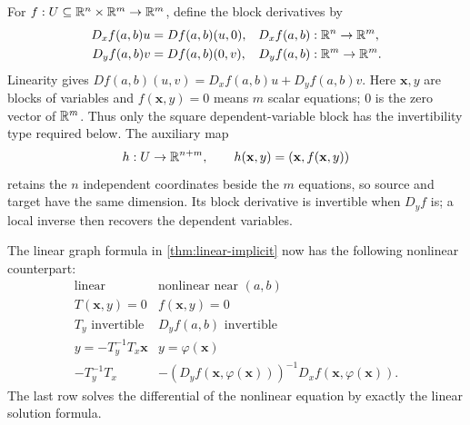 For $f:U\subseteq\mathbb{R}^n\times\mathbb{R}^m\to\mathbb{R}^m$, define the block derivatives by
\[
\begin{aligned}
D_xf(a,b)u&=Df(a,b)(u,0),&D_xf(a,b)&:\mathbb{R}^n\to\mathbb{R}^m,\\
D_yf(a,b)v&=Df(a,b)(0,v),&D_yf(a,b)&:\mathbb{R}^m\to\mathbb{R}^m.
\end{aligned}
\]
Linearity gives $Df(a,b)(u,v)=D_xf(a,b)u+D_yf(a,b)v$.
Here $\mathbf{x},y$ are blocks of variables and $f(\mathbf{x},y)=0$ means $m$ scalar
equations; $0$ is the zero vector of $\mathbb{R}^m$. Thus only the square
dependent-variable block has the invertibility type required below.
The auxiliary map
\[
h:U\to\mathbb{R}^{n+m},\qquad h(\mathbf{x},y)=(\mathbf{x},f(\mathbf{x},y))
\]
retains the $n$ independent coordinates beside the $m$ equations, so
source and target have the same dimension. Its block derivative is
invertible when $D_yf$ is; a local inverse then recovers the dependent variables.


The linear graph formula in \cref{thm:linear-implicit} now has the following
nonlinear counterpart:
\[
\begin{array}{c|c}
\text{linear}&\text{nonlinear near }(a,b)\\\hline
T(\mathbf{x},y)=0&f(\mathbf{x},y)=0\\
T_y\text{ invertible}&D_yf(a,b)\text{ invertible}\\
y=-T_y^{-1}T_x\mathbf{x}&y=\varphi(\mathbf{x})\\
-T_y^{-1}T_x&-(D_yf(\mathbf{x},\varphi(\mathbf{x})))^{-1}D_xf(\mathbf{x},\varphi(\mathbf{x})).
\end{array}
\]
The last row solves the differential of the nonlinear equation by exactly
the linear solution formula.

